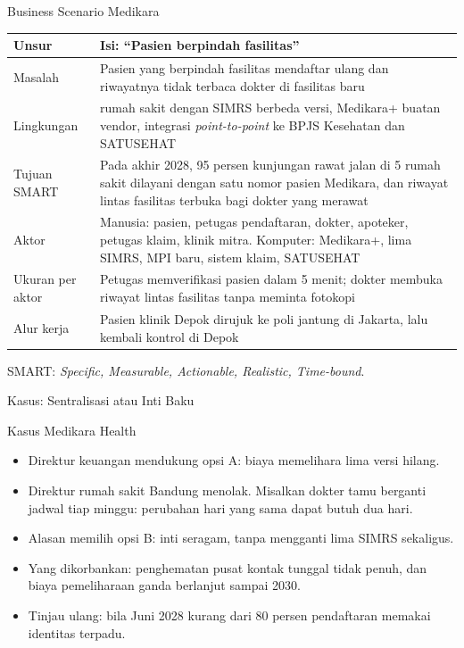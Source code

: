 \documentclass[aspectratio=169, table, 12pt]{beamer}
\begin{document}
\begin{frame}{{\Large Business Scenario Medikara}}
  \scriptsize
  \begin{tabularx}{\textwidth}{>{\raggedright\arraybackslash}p{2.6cm}>{\raggedright\arraybackslash}X}
    \hline
    \textbf{Unsur} & \textbf{Isi: ``Pasien berpindah fasilitas''} \\
    \hline
    Masalah & Pasien yang berpindah fasilitas mendaftar ulang dan riwayatnya tidak terbaca
      dokter di fasilitas baru \\
    \hline
    Lingkungan & 5 rumah sakit dengan SIMRS berbeda versi, Medikara+ buatan vendor,
      integrasi \textit{point-to-point} ke BPJS Kesehatan dan SATUSEHAT \\
    \hline
    Tujuan SMART & Pada akhir 2028, 95 persen kunjungan rawat jalan di 5 rumah sakit
      dilayani dengan satu nomor pasien Medikara, dan riwayat lintas fasilitas terbuka bagi
      dokter yang merawat \\
    \hline
    Aktor & Manusia: pasien, petugas pendaftaran, dokter, apoteker, petugas klaim, klinik
      mitra. Komputer: Medikara+, lima SIMRS, MPI baru, sistem klaim, SATUSEHAT \\
    \hline
    Ukuran per aktor & Petugas memverifikasi pasien dalam 5 menit; dokter membuka riwayat
      lintas fasilitas tanpa meminta fotokopi \\
    \hline
    Alur kerja & Pasien klinik Depok dirujuk ke poli jantung di Jakarta, lalu kembali
      kontrol di Depok \\
    \hline
  \end{tabularx}

  \vspace{6pt}
  \small SMART: \textit{Specific, Measurable, Actionable, Realistic, Time-bound}.
\end{frame}

\begin{frame}{{\Large Kasus: Sentralisasi atau Inti Baku}}
  \begin{block}{Kasus Medikara Health}
    \small
    \begin{itemize}
      \item Direktur keuangan mendukung opsi A: biaya memelihara lima versi hilang.
      \item Direktur rumah sakit Bandung menolak. Misalkan dokter tamu berganti jadwal tiap minggu:
            perubahan hari yang sama dapat butuh dua hari.
      \item Alasan memilih opsi B: inti seragam, tanpa mengganti lima SIMRS sekaligus.
      \item Yang dikorbankan: penghematan pusat kontak tunggal tidak penuh, dan biaya pemeliharaan ganda
            berlanjut sampai 2030.
      \item Tinjau ulang: bila Juni 2028 kurang dari 80 persen pendaftaran memakai identitas terpadu.
    \end{itemize}
  \end{block}
\end{frame}
\end{document}
